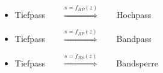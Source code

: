 \begin{itemize}
\begin{minipage}{0.45\textwidth}
\begin{itemize}
				 \item Tiefpass$\qquad\overset{s=f_{HP}(z)}{\Longrightarrow}\qquad$Hochpass
				\end{itemize}
			 \end{minipage}
			 \begin{minipage}{0.5\textwidth}
				\begin{itemize}
				 \item Tiefpass$\qquad\overset{s=f_{BP}(z)}{\Longrightarrow}\qquad$Bandpass\\[-0.3cm]
				 \item Tiefpass$\qquad\overset{s=f_{BS}(z)}{\Longrightarrow}\qquad$Bandsperre
				\end{itemize}
			 \end{minipage}
			\end{itemize}
\newpage
$ $\\
